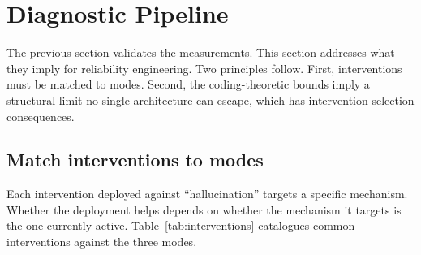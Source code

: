 \documentclass[11pt,a4paper]{article}
\begin{document}
\section{Diagnostic Pipeline}
\label{sec:pipeline}

The previous section validates the measurements. This section addresses what they imply for reliability engineering. Two principles follow. First, interventions must be matched to modes. Second, the coding-theoretic bounds imply a structural limit no single architecture can escape, which has intervention-selection consequences.


\subsection{Match interventions to modes}
\label{sec:pipeline-int}

Each intervention deployed against ``hallucination'' targets a specific mechanism. Whether the deployment helps depends on whether the mechanism it targets is the one currently active. Table~\ref{tab:interventions} catalogues common interventions against the three modes.
\end{document}
